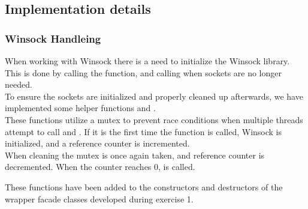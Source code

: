 \documentclass[Main]{subfiles}
\begin{document}
\subsection{Implementation details}
\subsubsection{Winsock Handleing}
When working with Winsock there is a need to initialize the Winsock library.
This is done by calling the  function, and calling  when sockets are no longer needed.\\
To ensure the sockets are initialized and properly cleaned up afterwards, 
we have implemented some helper functions  and .\\
These functions utilize a mutex to prevent race conditions when multiple threads attempt to call  and .
If it is the first time the function is called, Winsock is initialized, and a reference counter is incremented.\\
When cleaning the mutex is once again taken, and reference counter is decremented. When the counter reaches 0,  is called.

These functions have been added to the constructors and destructors of the wrapper facade classes developed during exercise 1.
\end{document}
